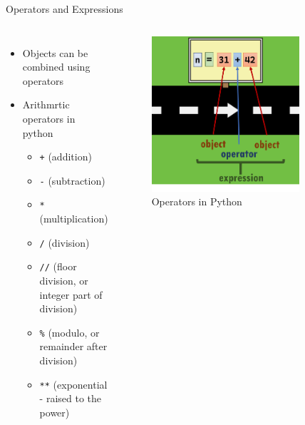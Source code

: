 \documentclass{beamer}
\begin{document}
\begin{frame}{Operators and Expressions}
    \begin{columns}
        \begin{itemize}
            \item Objects can be combined using operators
            \item Arithmrtic operators in python 
            \begin{itemize}
            \item \texttt{+} (addition)
            \item \texttt{-} (subtraction)
            \item \texttt{*} (multiplication)
            \item \texttt{/} (division)
            \item \texttt{//} (floor division, or integer part of division)
            \item \texttt{\%} (modulo, or remainder after division)
            \item \texttt{**} (exponential - raised to the power)
            \end{itemize}
                    \end{itemize}
        \begin{figure}
            \centering
            \includegraphics[width=0.8\textwidth]{pics/operator.png}
            \caption{Operators in Python}
        \end{figure}
    \end{columns}
\end{frame}
\end{document}
